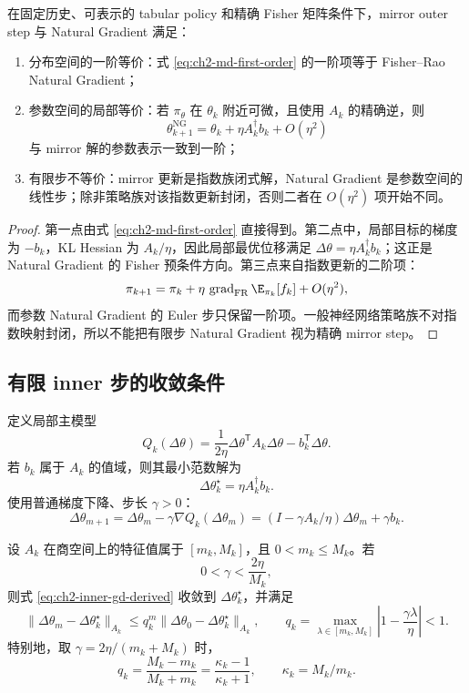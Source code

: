 \begin{theorem}
\label{thm:ch2-md-ng-equivalence}
在固定历史、可表示的 tabular policy 和精确 Fisher 矩阵条件下，mirror outer step 与 Natural Gradient 满足：
\begin{enumerate}
\item 分布空间的一阶等价：式 \eqref{eq:ch2-md-first-order} 的一阶项等于 Fisher--Rao Natural Gradient；
\item 参数空间的局部等价：若 $\pi_\theta$ 在 $\theta_k$ 附近可微，且使用 $A_k$ 的精确逆，则
\[
\theta_{k+1}^{\mathrm{NG}}
=\theta_k+\eta A_k^\dagger b_k+O(\eta^2)
\]
与 mirror 解的参数表示一致到一阶；
\item 有限步不等价：mirror 更新是指数族闭式解，Natural Gradient 是参数空间的线性步；除非策略族对该指数更新封闭，否则二者在 $O(\eta^2)$ 项开始不同。
\end{enumerate}
\end{theorem}

\begin{proof}
第一点由式 \eqref{eq:ch2-md-first-order} 直接得到。第二点中，局部目标的梯度为 $-b_k$，KL Hessian 为 $A_k/\eta$，因此局部最优位移满足 $\Delta\theta=\eta A_k^\dagger b_k$；这正是 Natural Gradient 的 Fisher 预条件方向。第三点来自指数更新的二阶项：
\[
\pi_{k+1}
=\pi_k+\eta\,\operatorname{grad}_{\mathrm{FR}}\E_{\pi_k}[f_k]
+O(\eta^2),
\]
而参数 Natural Gradient 的 Euler 步只保留一阶项。一般神经网络策略族不对指数映射封闭，所以不能把有限步 Natural Gradient 视为精确 mirror step。
\end{proof}

\subsection*{有限 inner 步的收敛条件}

定义局部主模型
\[
Q_k(\Delta\theta)
=
\frac{1}{2\eta}\Delta\theta^{\mathsf T}A_k\Delta\theta
-b_k^{\mathsf T}\Delta\theta.
\]
若 $b_k$ 属于 $A_k$ 的值域，则其最小范数解为
\[
\Delta\theta_k^\star=\eta A_k^\dagger b_k.
\]
使用普通梯度下降、步长 $\gamma>0$：
\begin{equation}
\label{eq:ch2-inner-gd-derived}
\Delta\theta_{m+1}
=
\Delta\theta_m-\gamma\nabla Q_k(\Delta\theta_m)
=
(I-\gamma A_k/\eta)\Delta\theta_m+\gamma b_k.
\end{equation}

\begin{theorem}
\label{thm:ch2-local-gd-derived}
设 $A_k$ 在商空间上的特征值属于
$[m_k,M_k]$，且 $0<m_k\leq M_k$。若
\[
0<\gamma<\frac{2\eta}{M_k},
\]
则式 \eqref{eq:ch2-inner-gd-derived} 收敛到 $\Delta\theta_k^\star$，并满足
\[
\|\Delta\theta_m-\Delta\theta_k^\star\|_{A_k}
\leq
q_k^m\|\Delta\theta_0-\Delta\theta_k^\star\|_{A_k},
\qquad
q_k=\max_{\lambda\in[m_k,M_k]}
\left|1-\frac{\gamma\lambda}{\eta}\right|<1.
\]
特别地，取 $\gamma=2\eta/(m_k+M_k)$ 时，
\[
q_k=\frac{M_k-m_k}{M_k+m_k}
=\frac{\kappa_k-1}{\kappa_k+1},
\qquad
\kappa_k=M_k/m_k.
\]
\end{theorem}

